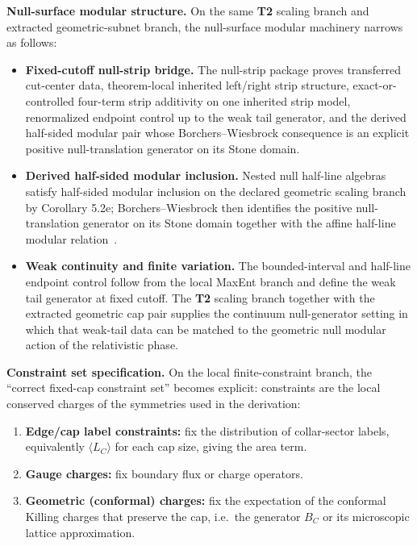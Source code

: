 \textbf{Null-surface modular structure.} On the same \textbf{T2} scaling branch and extracted geometric-subnet branch, the null-surface modular machinery narrows as follows:
\begin{itemize}
\item
\textbf{Fixed-cutoff null-strip bridge.} The null-strip package proves transferred cut-center data, theorem-local inherited left/right strip structure, exact-or-controlled four-term strip additivity on one inherited strip model, renormalized endpoint control up to the weak tail generator, and the derived half-sided modular pair whose Borchers--Wiesbrock consequence is an explicit positive null-translation generator on its Stone domain.
\item
\textbf{Derived half-sided modular inclusion.} Nested null half-line algebras satisfy half-sided modular inclusion on the declared geometric scaling branch by Corollary 5.2e; Borchers--Wiesbrock then identifies the positive null-translation generator on its Stone domain together with the affine half-line modular relation~\cite{wiesbrock93}.
\item
\textbf{Weak continuity and finite variation.} The bounded-interval and half-line endpoint control follow from the local MaxEnt branch and define the weak tail generator at fixed cutoff. The \textbf{T2} scaling branch together with the extracted geometric cap pair supplies the continuum null-generator setting in which that weak-tail data can be matched to the geometric null modular action of the relativistic phase.
\end{itemize}

\textbf{Constraint set specification.} On the local finite-constraint branch, the ``correct fixed-cap constraint set'' becomes explicit: constraints are the local conserved charges of the symmetries used in the derivation:
\begin{enumerate}
\def\labelenumi{\arabic{enumi}.}
\item
\textbf{Edge/cap label constraints:} fix the distribution of collar-sector labels, equivalently \(\langle L_C\rangle\) for each cap size, giving the area term.
\item
\textbf{Gauge charges:} fix boundary flux or charge operators.
\item
\textbf{Geometric (conformal) charges:} fix the expectation of the conformal Killing charges that preserve the cap, i.e.\ the generator \(B_C\) or its microscopic lattice approximation.
\end{enumerate}

